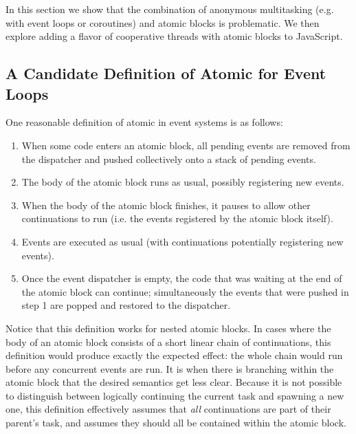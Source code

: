 \documentclass[acmsmall,anonymous,review]{acmart}\settopmatter{printfolios=true,printccs=false,printacmref=false}
\begin{document}

In this section we show that the combination of anonymous multitasking (e.g. with event loops or coroutines) and atomic blocks is problematic.
We then explore adding a flavor of cooperative threads with atomic blocks to JavaScript.

\subsection{A Candidate Definition of Atomic for Event Loops} \label{sec:candidate_atomic}

One reasonable definition of atomic in event systems is as follows:


\begin{enumerate}
\item When some code enters an atomic block, all pending events are removed from the dispatcher and pushed collectively onto a stack of pending events.
\item The body of the atomic block runs as usual, possibly registering new events.
\item When the body of the atomic block finishes, it pauses to allow other continuations to run (i.e. the events registered by the atomic block itself).
\item Events are executed as usual (with continuations potentially registering new events).
\item Once the event dispatcher is empty, the code that was waiting at the end of the atomic block can continue; simultaneously the events that were pushed in step 1 are popped and restored to the dispatcher.
\end{enumerate}

Notice that this definition works for nested atomic blocks.
In cases where the body of an atomic block consists of a short linear chain of continuations, this definition would produce exactly the expected effect: the whole chain would run before any concurrent events are run.
It is when there is branching within the atomic block that the desired semantics get less clear.
Because it is not possible to distinguish between logically continuing the current task and spawning a new one, this definition effectively assumes that \emph{all} continuations are part of their parent's task, and assumes they should all be contained within the atomic block.
\end{document}
